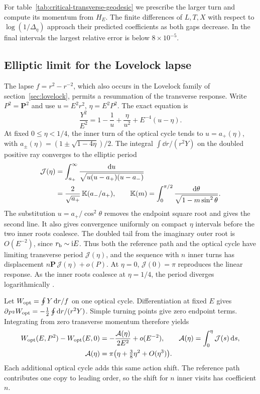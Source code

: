 For table~\ref{tab:critical-transverse-geodesic} we prescribe the
larger turn and compute its momentum from \(H_E\).
The finite differences of \(L,T,X\) with respect to
\(\log(1/\Delta_\eta)\) approach their predicted coefficients
as both gaps decrease. In the final intervals the largest
relative error is below \(8\times10^{-5}\).

\subsection{Elliptic limit for the Lovelock lapse}
\label{sec:finite-transverse-geodesic}

The lapse \(f=r^2-r^{-2}\), which also occurs in the Lovelock
family of section~\ref{sec:lovelock}, permits a resummation of the
transverse response. Write \(P^2=\boldsymbol P^2\) and use
\(u=E^2r^2\), \(\eta=E^2P^2\). The exact equation is
\begin{equation}
 \frac{Y^2}{E^2}=1-\frac1u+\frac{\eta}{u^2}
       +E^{-4}(u-\eta).
\end{equation}
At fixed \(0\leq\eta<1/4\), the inner turn of the optical cycle
tends to \(u=a_+(\eta)\), with
\(a_\pm(\eta)=(1\pm\sqrt{1-4\eta})/2\).
The integral \(\int \dd r/(r^2Y)\) on the doubled positive ray
converges to the elliptic period
\begin{align}
 \mathcal J(\eta)
 &=\int_{a_+}^{\infty}
     \frac{\mathrm{d} u}{\sqrt{u(u-a_+)(u-a_-)}} \notag\\
 &=\frac{2}{\sqrt{a_+}}\,\mathbb K(a_-/a_+),\qquad
 \mathbb K(m)=\int_0^{\pi/2}
      \frac{\mathrm{d}\theta}{\sqrt{1-m\sin^2\theta}} .
 \label{eq:jacobi-elliptic}
\end{align}
The substitution \(u=a_+/\cos^2\theta\) removes the endpoint
square root and gives the second line. It also gives convergence
uniformly on compact \(\eta\) intervals before the two inner
roots coalesce. The doubled tail from the imaginary outer root
is \(O(E^{-2})\), since \(r_{\rm b}\sim\mathrm{i} E\). Thus both the
reference path and the optical cycle have limiting transverse
period \(\mathcal J(\eta)\), and the sequence with \(n\) inner
turns has displacement \(n\boldsymbol P\,\mathcal J(\eta)+o(P)\).
At \(\eta=0\), \(\mathcal J(0)=\pi\) reproduces the linear
response. As the inner roots coalesce at \(\eta=1/4\), the
period diverges logarithmically \cite{NIST:DLMF}.

Let \(W_{\rm opt}=\oint Y\,\mathrm{d} r/f\) on one optical cycle.
Differentiation at fixed \(E\) gives
\(\partial_{P^2}W_{\rm opt}=-\tfrac12\oint\mathrm{d} r/(r^2Y)\).
Simple turning points give zero endpoint terms. Integrating
from zero transverse momentum therefore yields
\begin{align}
 W_{\rm opt}(E,P^2)-W_{\rm opt}(E,0)
   &=-\frac{\mathcal A(\eta)}{2E^2}+o(E^{-2}),\qquad
    \mathcal A(\eta)=\int_0^\eta\mathcal J(s)\,\mathrm{d} s,\notag\\
 \mathcal A(\eta)&=\pi\big(\eta+\tfrac38\eta^2+O(\eta^3)\big).
 \label{eq:jacobi-elliptic-action}
\end{align}
Each additional optical cycle adds this same action shift.
The reference path contributes one copy to leading order, so
the shift for \(n\) inner visits has coefficient \(n\).

